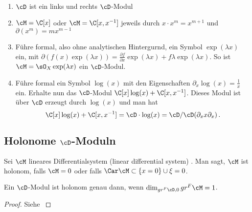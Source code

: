 \begin{exmp}
\cite[Exmp 2.2]{ArkhipovDmod}
\begin{enumerate}
%
\item $\cD$ ist ein links und rechts $\cD$-Modul
%
\item $\cM=\C[x]$ oder $\cM=\C[x,x^{-1}]$ jeweils durch $x\cdot x^{m}=x^{m+1}$
und $\partial(x^m)=mx^{m-1}$
%
\item \cite[Exmp 2.2]{ArkhipovDmod}
Führe formal, also ohne analytischen Hintergurnd, ein Symbol
$\exp(\lambda x)$ ein, mit $\partial(f(x)\exp(\lambda x))=\frac{\partial
f}{\partial x}\exp(\lambda x)+f\lambda\exp(\lambda x)$.  So ist
$\cM=\sO_X\exp(\lambda x)$ ein $\cD$-Modul.
%
\item \cite[Exmp 3.1.4]{ginzburg}
Führe formal ein Symbol $\log(x)$ mit den Eigenschaften
$\partial_x\log(x)=\frac{1}{x}$ ein. Erhalte nun das $\cD$-Modul
$\C[x]\log(x)+\C[x,x^{-1}]$. Dieses Modul ist über $\cD$ erzeugt durch
$\log(x)$ und man hat
\[
\C[x]\log(x)+\C[x,x^{-1}]=\cD\cdot\log(x)=\cD\slash\cD(\partial_x x\partial_x) \,.
\]
%
\end{enumerate}
\end{exmp}

\begin{comment}
\begin{lem}\cite[Lem 2.3.3.]{sabbah_cimpa90}
Sei $\cM$ ein links $\cD$-Modul von endlichem Typ, welches auch von endlichem
Typ über $\Ckx$ ist. Dann ist $\cM$ bereits ein freies $\C\{x\}$-Modul.
\end{lem}
\begin{proof}
Siehe \cite[Lem 2.3.3.]{sabbah_cimpa90}.
\end{proof}
\begin{cor} \cite[Cor 2.3.4.]{sabbah_cimpa90}
Falls $\cM$ ein links $\cD$-Modul von endlichem typ, welches außerdem ein
endich dimensionaler Vektorraum ist, so ist schon $\cM=\{0\}$.
\end{cor}
\end{comment}

\subsection{Holonome $\cD$-Moduln}
\begin{comment}
TODO: defn of Car als Charakteristische Varietät
\end{comment}
\begin{defn} \cite[Def 3.3.1.]{sabbah_cimpa90}
Sei $\cM$ lineares Differentialsystem
(linear differential system) %
.  Man sagt, $\cM$ ist holonom, falls $\cM=0$ oder falls $\Car\cM\subset
\{x=0\}\cup{\xi=0}$.
\end{defn}
\begin{lem} \cite[Lem 3.3.8.]{sabbah_cimpa90}
Ein $\cD$-Modul ist holonom genau dann, wenn $\dim_{gr^F\cD,0}gr^F\cM=1$.
\end{lem}
\begin{proof}
Siehe \cite[Lem 3.3.8.]{sabbah_cimpa90}
\end{proof}

